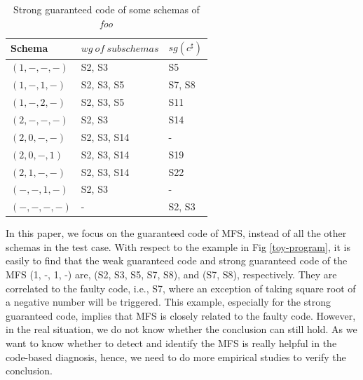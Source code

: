 \documentclass{sig-alternate-05-2015}
\begin{document}
\begin{table}[ht]
\caption{Strong guaranteed code of some schemas of \emph{foo}}
\label{strong-foo}
\center
\begin{tabular}{lll}
 \hline
\bfseries Schema & \bfseries $wg\ of\ subschemas$ & \bfseries $sg(c^{\sharp})$\\  \hline
 $(1, -, -, -)$ & S2, S3 & S5 \\
 $(1, -, 1, -)$ & S2, S3, S5 & S7, S8\\
 $(1, -, 2, -)$ & S2, S3, S5 & S11\\
 $(2, -, -, -)$ & S2, S3 &  S14\\
 $(2, 0, -, -)$ & S2, S3, S14 &  - \\
 $(2, 0, -, 1)$ & S2, S3, S14 & S19\\
 $(2, 1, -, -)$ & S2, S3, S14 & S22\\
 $(-, -, 1, -)$ & S2, S3 & - \\
 $(-, -, -, -)$ & - & S2, S3 \\
 \hline
\end{tabular}
\end{table}


In this paper, we focus on the guaranteed code of MFS, instead of all the other schemas in the test case. With respect to the example in Fig \ref{toy-program}, it is easily to find that the weak guaranteed code and strong guaranteed code of the MFS (1, -, 1, -) are, (S2, S3, S5, S7, S8), and (S7, S8),  respectively. They are correlated to the faulty code, i.e., S7, where an exception of taking square root of a negative number will be triggered. This example, especially for the strong guaranteed code, implies that MFS is closely related to the faulty code.  However, in the real situation, we do not know whether the conclusion can still hold. As we want to know whether to detect and identify the MFS is really helpful in the code-based diagnosis, hence, we need to do more empirical studies to verify the conclusion.


%
%
%

%
\end{document}
